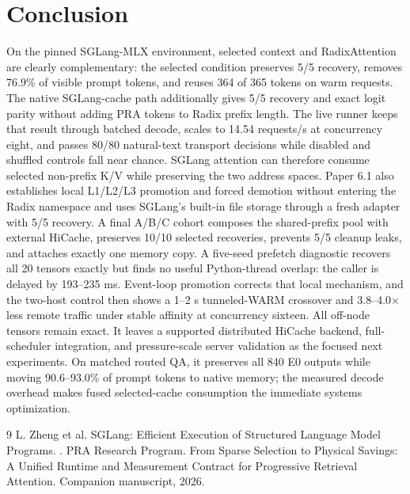 \documentclass[10pt]{article}
\begin{document}
\section{Conclusion}
On the pinned SGLang-MLX environment, selected context and RadixAttention are
clearly complementary: the selected condition preserves 5/5 recovery, removes
76.9\% of visible prompt tokens, and reuses 364 of 365 tokens on warm requests.
The native SGLang-cache path additionally gives 5/5 recovery and exact logit
parity without adding PRA tokens to Radix prefix length. The live runner keeps
that result through batched decode, scales to 14.54 requests/s at concurrency
eight, and passes 80/80 natural-text transport decisions while disabled and
shuffled controls fall near chance. SGLang attention can therefore consume
selected non-prefix K/V while preserving the two address spaces. Paper 6.1
also establishes local L1/L2/L3 promotion and forced demotion without entering
the Radix namespace and uses SGLang's built-in file storage through a fresh
adapter with 5/5 recovery. A final A/B/C cohort composes the shared-prefix pool with
external HiCache, preserves 10/10 selected recoveries, prevents 5/5 cleanup
leaks, and attaches exactly one memory copy. A five-seed prefetch diagnostic
recovers all 20 tensors exactly but finds no useful Python-thread overlap: the
caller is delayed by 193--235 ms. Event-loop promotion corrects that local
mechanism, and the two-host control then shows a 1--2 s tunneled-WARM crossover
and 3.8--4.0$\times$ less remote traffic under stable affinity at concurrency
sixteen. All off-node tensors remain exact. It leaves a supported distributed
HiCache backend, full-scheduler integration, and pressure-scale server
validation as the focused next experiments. On matched routed QA, it preserves all 840 E0
outputs while moving 90.6--93.0\% of prompt tokens to native memory; the measured
decode overhead makes fused selected-cache consumption the immediate systems
optimization.

\begin{thebibliography}{9}
L. Zheng et al.
\newblock SGLang: Efficient Execution of Structured Language Model Programs.
.
PRA Research Program.
\newblock From Sparse Selection to Physical Savings: A Unified Runtime and
Measurement Contract for Progressive Retrieval Attention.
\newblock Companion manuscript, 2026.
\end{thebibliography}
\end{document}
